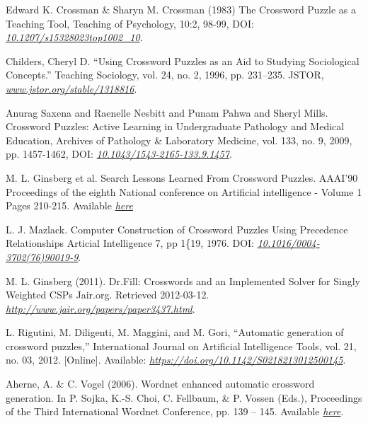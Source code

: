 \documentclass[twoside]{article}
\begin{document}
\begin{thebibliography}{99} %
Edward K. Crossman \& Sharyn M. Crossman (1983)
\newblock The Crossword Puzzle as a Teaching Tool, 
\newblock Teaching of Psychology, 10:2, 98-99, DOI: {\em \href{https://doi.org/10.1207/s15328023top1002_10}{10.1207/s15328023top1002\_10}}.

Childers, Cheryl D.
\newblock “Using Crossword Puzzles as an Aid to Studying Sociological Concepts.” 
\newblock Teaching Sociology, vol. 24, no. 2, 1996, pp. 231–235. JSTOR, {\em \href{www.jstor.org/stable/1318816}{www.jstor.org/stable/1318816}}.

Anurag  Saxena  and  Raenelle  Nesbitt  and  Punam  Pahwa  and  Sheryl  Mills.
\newblock Crossword Puzzles: Active Learning in Undergraduate Pathology and Medical Education, 
\newblock Archives of Pathology \& Laboratory Medicine, vol. 133, no. 9, 2009, pp. 1457-1462, DOI: {\em \href{www.archivesofpathology.org/doi/pdf/10.1043/1543-2165-133.9.1457}{10.1043/1543-2165-133.9.1457}}.

M. L. Ginsberg et al.
\newblock Search Lessons Learned From Crossword Puzzles.
\newblock AAAI'90 Proceedings of the eighth National conference on Artificial intelligence - Volume 1
Pages 210-215. Available {\em \href{https://pdfs.semanticscholar.org/1de1/b304d476488a4de29bedadd40364904c7637.pdf}{here}}

L. J. Mazlack.
\newblock Computer Construction of Crossword Puzzles Using Precedence Relationships 
\newblock  Articial Intelligence 7, pp 1\{19, 1976. DOI: {\em \href{https://doi.org/10.1016/0004-3702(76)90019-9}{10.1016/0004-3702(76)90019-9}}.

M. L. Ginsberg (2011).
\newblock Dr.Fill: Crosswords and an Implemented Solver for Singly Weighted CSPs
\newblock  Jair.org. Retrieved 2012-03-12. {\em \href{http://www.jair.org/papers/paper3437.html}{http://www.jair.org/papers/paper3437.html}}.

L. Rigutini, M. Diligenti, M. Maggini, and M. Gori,
\newblock “Automatic generation of crossword puzzles,”
\newblock  International Journal on Artificial Intelligence Tools, vol. 21, no. 03, 2012. [Online]. Available: {\em \href{https://doi.org/10.1142/S0218213012500145}{https://doi.org/10.1142/S0218213012500145}}.

Aherne, A. \& C. Vogel (2006). 
\newblock Wordnet enhanced automatic crossword generation.
\newblock  In P. Sojka, K.-S. Choi, C. Fellbaum, \& P. Vossen (Eds.), Proceedings of the Third International Wordnet Conference, pp. 139 – 145.  Available {\em \href{https://www.scss.tcd.ie/disciplines/intelligent_systems/clg/clg_web/ahernevogel06.pdf}{here}}.


\end{thebibliography}
\end{document}
